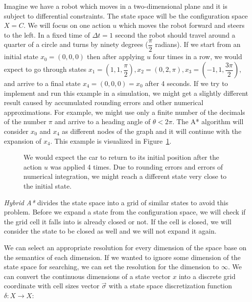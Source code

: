 \begin{example}
	Imagine we have a robot which moves in a two-dimensional plane and it is subject to differential constraints. The state space will be the configuration space $X=C$. We will focus on one action $u$ which moves the robot forward and steers to the left. In a fixed time of $\Delta t=1$ second the robot should travel around a quarter of a circle and turns by ninety degrees ($\dfrac{\pi}{2}$ radians). If we start from an initial state $x_0=\left(0,0,0\right)$ then after applying $u$ four times in a row, we would expect to go through states $x_1=\left(1,1,\dfrac{\pi}{2}\right),x_2=\left(0,2,\pi\right),x_3=\left(-1,1,\dfrac{3\pi}{2}\right)$, and arrive to a final state $x_4=\left(0,0,0\right)=x_0$ after 4 seconds. If we try to implement and run this example in a simulation, we might get a slightly different result caused by accumulated rounding errors and other numerical approximations. For example, we might use only a finite number of the decimals of the number $\pi$ and arrive to a heading angle of $\theta<2\pi$. The A* algorithm will consider $x_0$ and $x_4$ as different nodes of the graph and it will continue with the expansion of $x_4$. This example is visualized in Figure~\ref{fig:no_discretization_example}.
\end{example}

\begin{figure}
	\centering
	\caption{We would expect the car to return to its initial position after the action $u$ was applied 4 times. Due to rounding errors and errors of numerical integration, we might reach a different state very close to the initial state.}
	\label{fig:no_discretization_example}
\end{figure}

\textit{Hybrid A*} divides the state space into a grid of similar states to avoid this problem. Before we expand a state from the configuration space, we will check if the grid cell it falls into is already closed or not. If the cell is closed, we will consider the state to be closed as well and we will not expand it again.

We can select an appropriate resolution for every dimension of the space base on the semantics of each dimension. If we wanted to ignore some dimension of the state space for searching, we can set the resolution for the dimension to $\infty$. We can convert the continuous dimensions of a state vector $x$ into a discrete grid coordinate with cell sizes vector $\vec{\sigma}$ with a state space discretization function $\delta: X\rightarrow X$:


